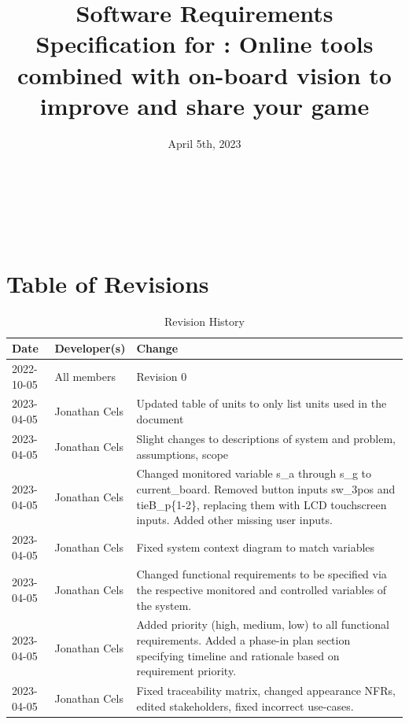 \documentclass[12pt]{article}
\begin{document}
\title{Software Requirements Specification for \progname{}: Online tools combined with on-board vision to improve and share your game} 
\author{\authname}
\date{April 5th, 2023}
	
\maketitle

~\newpage

\tableofcontents

~\newpage

\section*{Table of Revisions}
\begin{table}[hp]
\caption{Revision History} \label{TblRevisionHistory}
\begin{tabularx}{\textwidth}{llX}
\toprule
\textbf{Date} & \textbf{Developer(s)} & \textbf{Change}\\
\midrule
2022-10-05 & All members & Revision 0\\
2023-04-05 & Jonathan Cels & Updated table of units to only list units used in the document\\
2023-04-05 & Jonathan Cels & Slight changes to descriptions of system and problem, assumptions, scope\\ 
2023-04-05 & Jonathan Cels & Changed monitored variable s\_a through s\_g to current\_board. Removed button inputs sw\_3pos and tieB\_p\{1-2\}, replacing them with LCD touchscreen inputs. Added other missing user inputs.\\
2023-04-05 & Jonathan Cels & Fixed system context diagram to match variables\\
2023-04-05 & Jonathan Cels & Changed functional requirements to be specified via the respective monitored and controlled variables of the system.\\
2023-04-05 & Jonathan Cels & Added priority (high, medium, low) to all functional requirements. Added a phase-in plan section specifying timeline and rationale based on requirement priority.\\
2023-04-05 & Jonathan Cels & Fixed traceability matrix, changed appearance NFRs, edited stakeholders, fixed incorrect use-cases.\\
\bottomrule
\end{tabularx}
\end{table}
\end{document}
